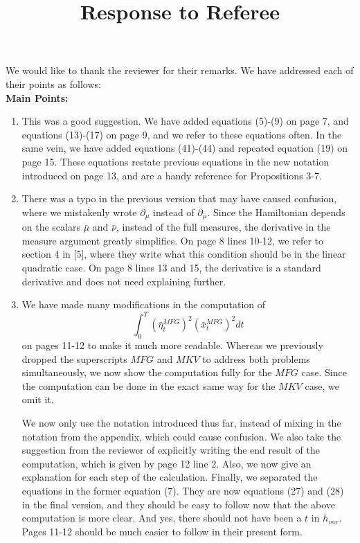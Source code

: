 \documentclass[11pt]{article}
\title{Response to Referee}
\author{}
\begin{document}
\maketitle

We would like to thank the reviewer for their remarks. We have addressed each of their points as follows:\\

\hspace{-7mm} \textbf{Main Points:}
\begin{enumerate}
	\item This was a good suggestion. We have added equations (5)-(9) on page 7, and equations (13)-(17) on page 9, and we refer to these equations often. In the same vein, we have added equations (41)-(44) and repeated equation (19) on page 15. These equations restate previous equations in the new notation introduced on page 13, and are a handy reference for Propositions 3-7.
	\item There was a typo in the previous version that may have caused confusion, where we mistakenly wrote $\partial_{\mu}$ instead of $\partial_{\bar{\mu}}$. Since the Hamiltonian depends on the scalars $\bar{\mu}$ and $\bar{\nu}$, instead of the full measures, the derivative in the measure argument greatly simplifies. On page 8 lines 10-12, we refer to section 4 in [5], where they write what this condition should be in the linear quadratic case. On page 8 lines 13 and 15, the derivative is a standard derivative and does not need explaining further. 
	\item We have made many modifications in the computation of
	 $$\int_0^T (\bar{\eta}^{MFG}_t)^2 (\bar{x}^{MFG}_t)^2dt$$
	  on pages 11-12 to make it much more readable. Whereas we previously dropped the superscripts $MFG$ and $MKV$ to address both problems simultaneously, we now show the computation fully for the $MFG$ case. Since the computation can be done in the exact same way for the $MKV$ case, we omit it.
	  
	  We now only use the notation introduced thus far, instead of mixing in the notation from the appendix, which could cause confusion. We also take the suggestion from the reviewer of explicitly writing the end result of the computation, which is given by page 12 line 2. Also, we now give an explanation for each step of the calculation. Finally, we separated the equations in the former equation (7). They are now equations (27) and (28) in the final version, and they should be easy to follow now that the above computation is more clear. And yes, there should not have been a $t$ in $h_{var}$. Pages 11-12 should be much easier to follow in their present form.
	  

\end{enumerate}
\end{document}
